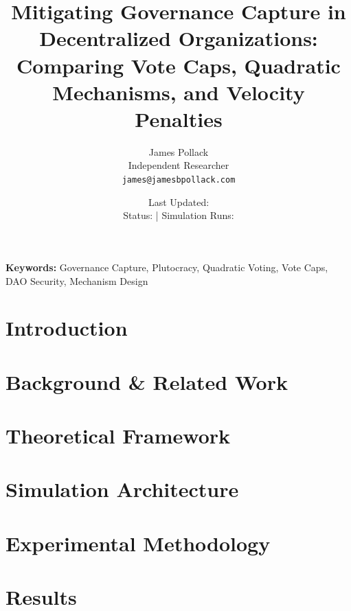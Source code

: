 \documentclass[11pt]{article}
\title{
    \textbf{Mitigating Governance Capture in Decentralized Organizations:}\\
    \large Comparing Vote Caps, Quadratic Mechanisms, and Velocity Penalties
}
\author{
    James Pollack\\
    Independent Researcher\\
    \texttt{james@jamesbpollack.com}
}
\date{
    Last Updated: \lastupdate\\
    \small Status: \paperstatus{} | Simulation Runs: \experimentruns{}
}
\begin{document}
\maketitle

\begin{abstract}

\end{abstract}

\textbf{Keywords:} Governance Capture, Plutocracy, Quadratic Voting, Vote Caps, DAO Security, Mechanism Design


\section{Introduction}
\label{sec:introduction}


\section{Background \& Related Work}
\label{sec:background}


\section{Theoretical Framework}
\label{sec:theory}


\section{Simulation Architecture}
\label{sec:architecture}


\section{Experimental Methodology}
\label{sec:methodology}


\section{Results}
\label{sec:results}

\end{document}
